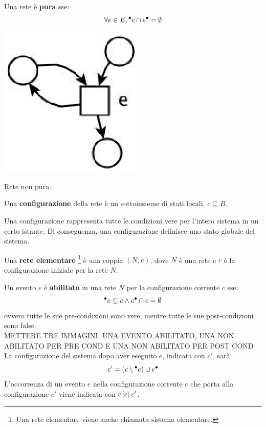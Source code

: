 \begin{defn}
    Una rete è \textbf{pura} sse:
    \[
        \forall e \in E, {^\bullet}e \cap e^\bullet = \emptyset
    \]
    \begin{marginfigure}[-1cm]
        \includegraphics[width=0.4\linewidth]{img/rete_non_pura.png}
        \caption{Rete non pura.}
        \label{fig:rete_non_pura}
    \end{marginfigure}
\end{defn}

\begin{defn}
    Una \textbf{configurazione} della rete è un sottoinsieme di stati locali, $c \subseteq B$.

    Una configurazione rappresenta tutte le condizioni vere per l'intero sistema in un certo istante. Di conseguenza, una configurazione definisce uno stato globale del sistema.
\end{defn}

\begin{defn}
    Una \textbf{rete elementare} \footnote{Una rete elementare viene anche chiamata sistema elementare.} è una coppia $(N, c)$, dove $N$ è una rete e $c$ è la configurazione iniziale per la rete $N$.
\end{defn}

\begin{defn}
    Un evento $e$ è \textbf{abilitato} in una rete $N$ per la configurazione corrente $c$ sse:
    \[
        {^\bullet}e \subseteq c \land e^\bullet \cap c = \emptyset
    \]
    ovvero tutte le sue pre-condizioni sono vere, mentre tutte le sue post-condizioni sono false.\\
    METTERE TRE IMMAGINI. UNA EVENTO ABILITATO, UNA NON ABILITATO PER PRE COND E UNA NON ABILITATO PER POST COND\\
    La configurazione del sistema dopo aver eseguito $e$, indicata con $c'$, sarà:
    \[
        c' = \left(c \setminus {^\bullet}e\right) \cup e^\bullet
    \]
    L'occorrenza di un evento $e$ nella configurazione corrente $c$ che porta alla configurazione $c'$ viene indicata con $c\,[e\rangle\,c'$.
\end{defn}

